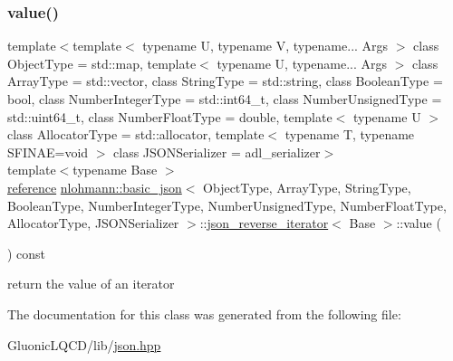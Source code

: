 \subsubsection{\texorpdfstring{value()}{value()}}
{\footnotesize\ttfamily template$<$template$<$ typename U, typename V, typename... Args $>$ class Object\+Type = std\+::map, template$<$ typename U, typename... Args $>$ class Array\+Type = std\+::vector, class String\+Type  = std\+::string, class Boolean\+Type  = bool, class Number\+Integer\+Type  = std\+::int64\+\_\+t, class Number\+Unsigned\+Type  = std\+::uint64\+\_\+t, class Number\+Float\+Type  = double, template$<$ typename U $>$ class Allocator\+Type = std\+::allocator, template$<$ typename T, typename S\+F\+I\+N\+A\+E=void $>$ class J\+S\+O\+N\+Serializer = adl\+\_\+serializer$>$ \\
template$<$typename Base $>$ \\
\mbox{\hyperlink{classnlohmann_1_1basic__json_1_1json__reverse__iterator_ab0021ef2007fd338615360af404dcd4e}{reference}} \mbox{\hyperlink{classnlohmann_1_1basic__json}{nlohmann\+::basic\+\_\+json}}$<$ Object\+Type, Array\+Type, String\+Type, Boolean\+Type, Number\+Integer\+Type, Number\+Unsigned\+Type, Number\+Float\+Type, Allocator\+Type, J\+S\+O\+N\+Serializer $>$\+::\mbox{\hyperlink{classnlohmann_1_1basic__json_1_1json__reverse__iterator}{json\+\_\+reverse\+\_\+iterator}}$<$ Base $>$\+::value (\begin{DoxyParamCaption}{ }\end{DoxyParamCaption}) const\hspace{0.3cm}{\ttfamily [inline]}}



return the value of an iterator 



The documentation for this class was generated from the following file\+:\begin{DoxyCompactItemize}
\item 
Gluonic\+L\+Q\+C\+D/lib/\mbox{\hyperlink{json_8hpp}{json.\+hpp}}\end{DoxyCompactItemize}
